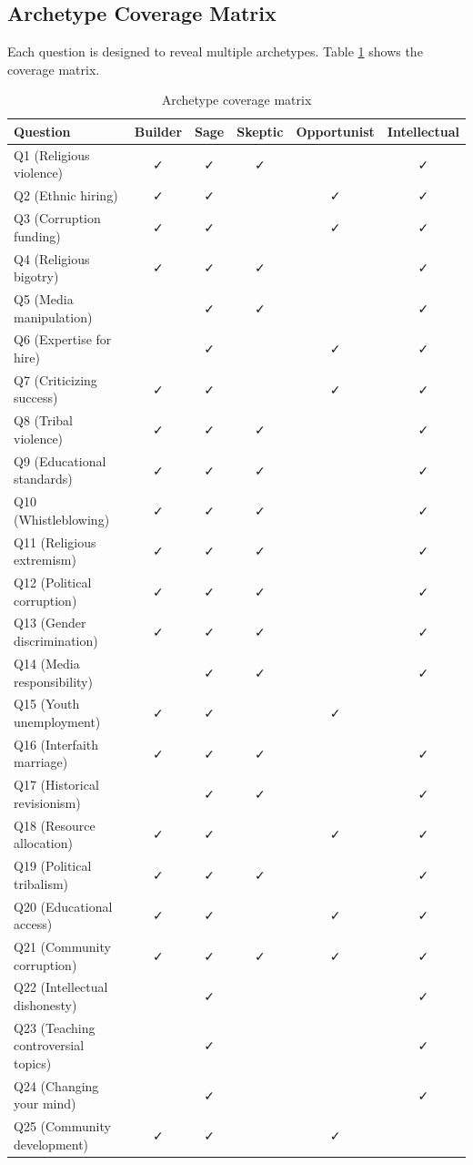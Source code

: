 \documentclass[11pt,a4paper]{article}
\begin{document}
\subsection{Archetype Coverage Matrix}

Each question is designed to reveal multiple archetypes. Table \ref{tab:coverage} shows the coverage matrix.

\begin{table}[h]
\centering
\small
\begin{tabular}{lccccc}
\toprule
\textbf{Question} & \textbf{Builder} & \textbf{Sage} & \textbf{Skeptic} & \textbf{Opportunist} & \textbf{Intellectual} \\
\midrule
Q1 (Religious violence) & ✓ & ✓ & ✓ & & ✓ \\
Q2 (Ethnic hiring) & ✓ & ✓ & & ✓ & ✓ \\
Q3 (Corruption funding) & ✓ & ✓ & & ✓ & ✓ \\
Q4 (Religious bigotry) & ✓ & ✓ & ✓ & & ✓ \\
Q5 (Media manipulation) & & ✓ & ✓ & & ✓ \\
Q6 (Expertise for hire) & & ✓ & & ✓ & ✓ \\
Q7 (Criticizing success) & ✓ & ✓ & & ✓ & ✓ \\
Q8 (Tribal violence) & ✓ & ✓ & ✓ & & ✓ \\
Q9 (Educational standards) & ✓ & ✓ & ✓ & & ✓ \\
Q10 (Whistleblowing) & ✓ & ✓ & ✓ & & ✓ \\
Q11 (Religious extremism) & ✓ & ✓ & ✓ & & ✓ \\
Q12 (Political corruption) & ✓ & ✓ & ✓ & & ✓ \\
Q13 (Gender discrimination) & ✓ & ✓ & ✓ & & ✓ \\
Q14 (Media responsibility) & & ✓ & ✓ & & ✓ \\
Q15 (Youth unemployment) & ✓ & ✓ & & ✓ & \\
Q16 (Interfaith marriage) & ✓ & ✓ & ✓ & & ✓ \\
Q17 (Historical revisionism) & & ✓ & ✓ & & ✓ \\
Q18 (Resource allocation) & ✓ & ✓ & & ✓ & ✓ \\
Q19 (Political tribalism) & ✓ & ✓ & ✓ & & ✓ \\
Q20 (Educational access) & ✓ & ✓ & & ✓ & ✓ \\
Q21 (Community corruption) & ✓ & ✓ & ✓ & ✓ & ✓ \\
Q22 (Intellectual dishonesty) & & ✓ & & & ✓ \\
Q23 (Teaching controversial topics) & & ✓ & & & ✓ \\
Q24 (Changing your mind) & & ✓ & & & ✓ \\
Q25 (Community development) & ✓ & ✓ & & ✓ & \\
\bottomrule
\end{tabular}
\caption{Archetype coverage matrix}
\label{tab:coverage}
\end{table}
\end{document}
